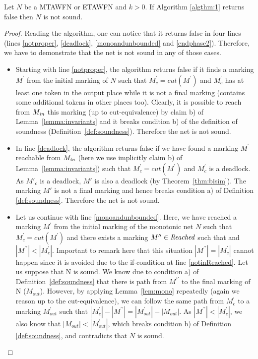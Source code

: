 \begin{lemma}\label{algthm:1:false}
	Let $N$ be a MTAWFN or ETAWFN and $k > 0$. If Algorithm \ref{algthm:1} returns false then $N$ is not sound. 
\end{lemma}
\begin{proof}%
	Reading the algorithm, one can notice that it returns false in four lines (lines \ref{notproper}, \ref{deadlock}, \ref{monoandunbounded} and \ref{endphase2}). 
	Therefore, we have to demonstrate that the net is not sound in any
of those cases.
	\begin{itemize}
	\item Starting with line \ref{notproper}, the algorithm returns false if it finds a marking $M^\prime$ 
	from the initial marking of $N$ such that $M^\prime_c=cut(M^\prime)$ and  $M^\prime_c$ has at least one token in the output place  while
  it is not a final marking (contains some additional tokens in other places 
  too). Clearly, it is possible to reach from $M_{{\mathit{in}}}$ 
 this marking (up to cut-equivalence) by claim b) of 
 Lemma~\ref{lemma:invariants} and it breaks condition b) of the definition
 of soundness (Definition~\ref{def:soundness}). Therefore the net is not sound. 

  \item In line \ref{deadlock}, the algorithm returns false if we have found a marking  $M^\prime$ reachable from $M_{{\mathit{in}}}$ (here we use implicitly
claim b) of Lemma~\ref{lemma:invariants})
        such that $M^\prime_c=cut(M^\prime)$
        and  $M^\prime_c$ is a deadlock. As $M'_c$ is a deadlock, 
				$M'$ is also a deadlock (by Theorem~\ref{thm:bisim}).  
							The marking $M'$ is not a final marking and hence 
        breaks condition a) of Definition \ref{def:soundness}.
        Therefore the net is not sound.

	\item Let us continue with line \ref{monoandunbounded}. Here, we have reached a marking  $M^\prime$ 
	from the initial marking of the monotonic net $N$  such that $M^\prime_c=cut(M^\prime)$  
	and there exists a marking $M^{\prime\prime} \in {\mathit{Reached}}$
	such that  and $|M^{\prime\prime}| < |M^{\prime}_c|$. Important to remark here that 
	this situation $|M^{\prime\prime}| = |M^{\prime}_c|$ cannot happen since it is avoided due to the if-condition at line \ref{notinReached}.
	Let us suppose that N is sound. We know due to condition a) of Definition~\ref{def:soundness} that
	there is path from $M^{\prime\prime}$ to the final marking of N ($M_{out}$). However, by applying Lemma~\ref{lem:mono} repeatedly (again we reason up to the cut-equivalence), we can follow the same
	path from $M^\prime_c$ to a marking $M^\prime_{out}$ such that $|M^\prime_c|-|M^{\prime\prime}|=|M^\prime_{out}|-|M_{out}|$. As $|M^{\prime\prime}| < |M^{\prime}_c|$, we also know
	that $|M_{out}| < |M^\prime_{out}|$, which breaks condition b) of Definition \ref{def:soundness}, and contradicts that $N$ is sound.
	

\end{itemize}
\end{proof}
